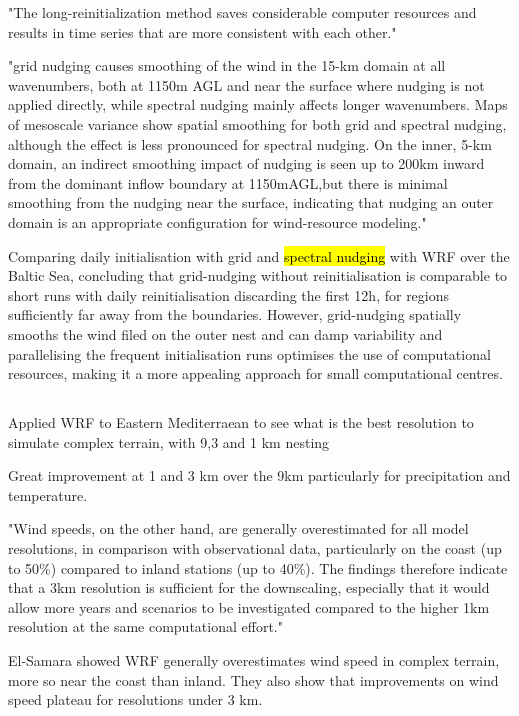 \documentclass[12pt,a4paper]{article}
\begin{document}
"The long-reinitialization method saves considerable computer resources and results in time series that are more consistent with each other."

"grid nudging causes smoothing of the wind in the 15-km domain at all wavenumbers, both at 1150m AGL and near the surface where nudging is not applied directly, while spectral nudging mainly affects longer wavenumbers. Maps of mesoscale variance show spatial smoothing for both grid and spectral nudging, although the effect is less pronounced for spectral nudging. On the inner, 5-km domain, an indirect smoothing impact of nudging is seen up to 200km inward from the dominant inflow boundary at 1150mAGL,but there is minimal smoothing from the nudging near the surface, indicating that nudging an outer domain is an appropriate configuration for wind-resource modeling."

Comparing daily initialisation with grid and \hl{spectral nudging} with WRF over the Baltic Sea, concluding that grid-nudging without reinitialisation is comparable to short runs with daily reinitialisation discarding the first 12h, for regions sufficiently far away from the boundaries. However, grid-nudging spatially smooths the wind filed on the outer nest and can damp variability and parallelising the frequent initialisation runs optimises the use of computational resources, making it a more appealing approach for small computational centres.

\subsection{\cite{El-Samra2018}}

Applied WRF to Eastern Mediterraean to see what is the best resolution to simulate complex terrain, with 9,3 and 1 km nesting

Great improvement at 1 and 3 km over the 9km particularly for precipitation and temperature. 

"Wind speeds, on the other hand, are generally overestimated for all model resolutions, in comparison with observational data, particularly on the coast (up to 50\%) compared to inland stations (up to 40\%). The findings therefore indicate that a 3km resolution is sufficient for the downscaling, especially that it would allow more years and scenarios to be investigated compared to the higher 1km resolution at the same computational effort."

El-Samara showed WRF generally overestimates wind speed in complex terrain, more so near the coast than inland. They also show that improvements on wind speed plateau for resolutions under 3 km.
\end{document}
